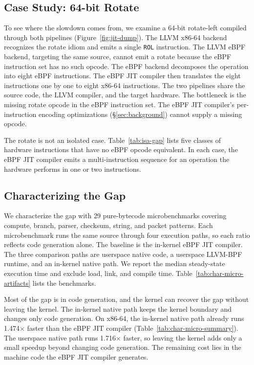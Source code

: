 \subsection{Case Study: 64-bit Rotate}
\label{subsec:rootcause}

To see where the slowdown comes from, we examine a 64-bit rotate-left compiled through both pipelines (Figure~\ref{fig:jit-dump}). The LLVM x86-64 backend recognizes the rotate idiom and emits a single \texttt{ROL} instruction. The LLVM eBPF backend, targeting the same source, cannot emit a rotate because the eBPF instruction set has no such opcode. The eBPF backend decomposes the operation into eight eBPF instructions. The eBPF JIT compiler then translates the eight instructions one by one to eight x86-64 instructions. The two pipelines share the source code, the LLVM compiler, and the target hardware. The bottleneck is the missing rotate opcode in the eBPF instruction set. The eBPF JIT compiler's per-instruction encoding optimizations (\S\ref{sec:background}) cannot supply a missing opcode.



The rotate is not an isolated case. Table~\ref{tab:isa-gap} lists five classes of hardware instructions that have no eBPF opcode equivalent. In each case, the eBPF JIT compiler emits a multi-instruction sequence for an operation the hardware performs in one or two instructions.



\subsection{Characterizing the Gap}
\label{subsec:gap}

We characterize the gap with 29 pure-bytecode microbenchmarks covering compute, branch, parser, checksum, string, and packet patterns. Each microbenchmark runs the same source through four execution paths, so each ratio reflects code generation alone. The baseline is the in-kernel eBPF JIT compiler. The three comparison paths are userspace native code, a userspace LLVM-BPF runtime, and an in-kernel native path. We report the median steady-state execution time and exclude load, link, and compile time. Table~\ref{tab:char-micro-artifacts} lists the benchmarks.



Most of the gap is in code generation, and the kernel can recover the gap without leaving the kernel. The in-kernel native path keeps the kernel boundary and changes only code generation. On x86-64, the in-kernel native path already runs 1.474$\times$ faster than the eBPF JIT compiler (Table~\ref{tab:char-micro-summary}). The userspace native path runs 1.716$\times$ faster, so leaving the kernel adds only a small speedup beyond changing code generation. The remaining cost lies in the machine code the eBPF JIT compiler generates.

